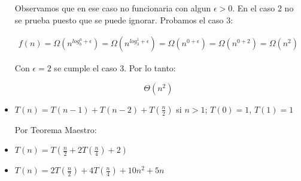 \documentclass[12pt]{article}
\begin{document}
\begin{itemize}
        Observamos que en ese caso no funcionaria con algun $\epsilon > 0$. En el caso 2 no se prueba puesto que se puede ignorar. Probamos el caso 3:
        
        \begin{equation*}
          \begin{split}
            f(n) = \Omega( n^{log_{b}^{a} + \epsilon}) = \Omega( n^{log_{3}^{1} + \epsilon}) = \Omega( n^{0 + \epsilon}) = \Omega( n^{0 + 2}) = \Omega( n^{2}) 
          \end{split}
        \end{equation*}

        Con $\epsilon = 2$ se cumple el caso 3. Por lo tanto:

        $$ \Theta\left( n^{2} \right) $$

      \item $ T(n) = T(n - 1) + T(n - 2) + T(\frac{n}{2})$ si $n>1$;  $T(0) = 1$, $T(1) = 1$

      Por Teorema Maestro:






      \item $ T(n) = T(\frac{n}{2} + 2T(\frac{n}{4}) + 2)$
      \item $ T(n) = 2T(\frac{n}{2}) + 4T(\frac{n}{4}) + 10n^{2} + 5n $
    \end{itemize}

    
\end{document}
